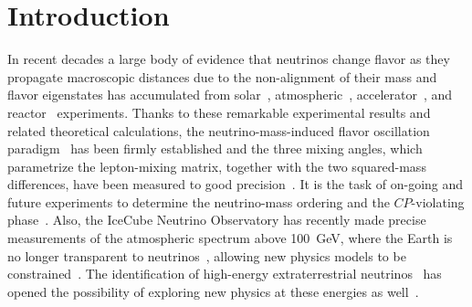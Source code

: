 \documentclass[3p,12pt]{elsarticle}
\newcounter{bla}
\begin{document}
\hypersetup{linkcolor=black}
\tableofcontents
\hypersetup{linkcolor=blue}
\newpage

\ifdefined\manualonly
\else %
\section{Introduction}
\label{sec:intro} 

In recent decades a large body of evidence that neutrinos change
flavor as they propagate macroscopic distances due to the
non-alignment of their mass and flavor eigenstates has accumulated from
solar~\citep{Abe:2010hy, Borexino2014},
atmospheric~\citep{PhysRevD.91.072004,Richard:2015aua,IceCube:2019dqi,ANTARES:2018rtf},
accelerator~\citep{PhysRevLett.112.181801,
  PhysRevD.93.051104,PhysRevLett.116.151806, PhysRevLett.110.251801}, and
reactor~\citep{An:2013zwz,Abe:2015rcp, Kim:2016yvm} experiments.
Thanks to these remarkable
experimental results and related theoretical calculations, the
  neutrino-mass-induced flavor oscillation paradigm~\citep{Pontecorvo:1967fh,Gribov:1968kq,fukugita2003physics,
  Akhmedov:1999uz,Balantekin:2013kc, GonzalezGarcia:2007ib,Mohapatra:qv, Gouvea:2013fj}
has been firmly established and the three mixing angles, which
parametrize the lepton-mixing matrix, together with the two
squared-mass differences, have been measured to good
precision~\citep{Esteban:2020cvm,deSalas:2017kay,Capozzi:2018ubv,deSalas:2020pgw}. It
is the task of on-going 
and future experiments to determine the neutrino-mass ordering 
and the $CP$-violating phase~\citep{Hewett:2012et,
  Acciarri:2016crz,Aartsen:2014oha, Kouchner:2016pqa,DeRosa:2016ifc}. 
Also, the IceCube Neutrino Observatory has recently made precise measurements of the atmospheric
spectrum above 100~GeV, where the Earth is no longer transparent to
neutrinos~\citep{Donini:2018tsg,Bustamante:2017xuy,IceCube:2020rnc}, allowing new physics
models to be constrained~\citep{Aartsen:2014gkd,TheIceCube:2016oqi}.
The identification of high-energy
extraterrestrial neutrinos~\citep{Aartsen:2014gkd,Aartsen:2015rwa,IceCube:2020wum}
has opened the possibility of exploring new physics at these energies as well~\citep{Arguelles:2015dca, Bustamante:2015waa, Baerwald:2012kc,Arguelles:2019rbn, Esteban:2021tub}. 
\end{document}
